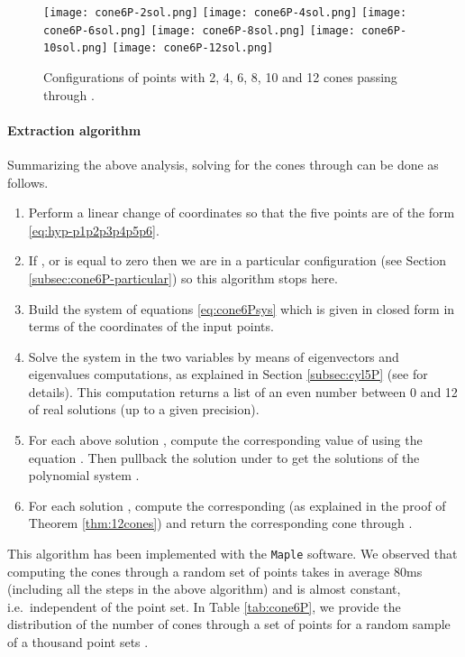 \documentclass[5p]{elsarticle}
\newcommand{\com}[1]{{\color{black} #1}}
\begin{document}
\begin{figure}[ht!]
\centering	
   \texttt{[image: cone6P-2sol.png]}
   \texttt{[image: cone6P-4sol.png]}
   \texttt{[image: cone6P-6sol.png]}
   \texttt{[image: cone6P-8sol.png]}
   \texttt{[image: cone6P-10sol.png]}
   \texttt{[image: cone6P-12sol.png]}
   \caption{Configurations of points  with 2, 4, 6, 8, 10 and 12 cones passing through .}
   \label{fig:cones}
\end{figure}  

\paragraph{Extraction algorithm}

Summarizing the above analysis, \com{solving for the} cones through  can be done as follows. 

\begin{enumerate}
	\item Perform a linear change of coordinates so that the five points are of the form \eqref{eq:hyp-p1p2p3p4p5p6}. 
	\item If ,  or  is equal to zero then we are in a particular configuration (see Section \ref{subsec:cone6P-particular}) \com{so this} algorithm stops here.  
	\item Build the system of equations \eqref{eq:cone6Psys} which is given in closed form in terms of the coordinates of the input points.
	\item Solve the system  in the two variables  by means of eigenvectors and eigenvalues computations, as explained in Section \ref{subsec:cyl5P} (see \cite{BKM05} for details). \com{This computation} returns a list of an even number between 0 and 12 of \com{real} solutions (up to a given precision).  
	\item For each above solution , compute the corresponding value of  \com{using} the equation . \com{Then pullback} the solution  under  to get the solutions  of the polynomial system . 
	\item For each solution , compute the corresponding  (as explained in the proof of Theorem \ref{thm:12cones}) and return the corresponding cone through .
\end{enumerate} 

This algorithm has been implemented with the {\tt Maple} software. We observed that \com{computing} the cones through a random set of points takes in average 80ms \com{(including all the steps in the above algorithm)} and is almost constant, \com{i.e.~independent} of the point set. In Table \ref{tab:cone6P}, we provide the \com{distribution} of the number of cones through a set of \com{points}  for a random sample of a thousand point sets .
\end{document}
